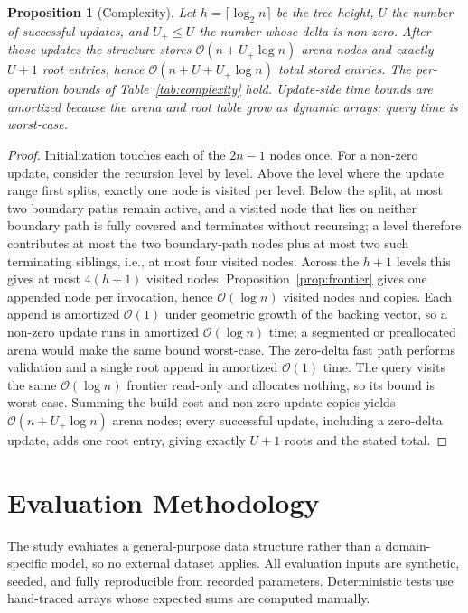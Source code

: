\documentclass[conference]{IEEEtran}
\newtheorem{proposition}{Proposition}
\begin{document}
\begin{proposition}[Complexity]
\label{prop:complexity}
Let $h = \lceil \log_2 n \rceil$ be the tree height, $U$ the number of successful updates, and
$U_{+}\leq U$ the number whose delta is non-zero. After those updates the structure stores
$\mathcal{O}(n+U_{+}\log n)$ arena nodes and exactly $U+1$ root entries, hence
$\mathcal{O}(n+U+U_{+}\log n)$ total stored entries. The per-operation bounds of
Table~\ref{tab:complexity} hold. Update-side time bounds are amortized because the arena and root
table grow as dynamic arrays; query time is worst-case.
\end{proposition}

\begin{proof}
Initialization touches each of the $2n-1$ nodes once. For a non-zero update, consider the
recursion level by level. Above the level where the update range first splits, exactly one node
is visited per level. Below the split, at most two boundary paths remain active, and a visited
node that lies on neither boundary path is fully covered and terminates without recursing; a
level therefore contributes at most the two boundary-path nodes plus at most two such
terminating siblings, i.e., at most four visited nodes. Across the $h+1$ levels this gives at most $4(h+1)$ visited
nodes. Proposition~\ref{prop:frontier} gives one appended node per invocation, hence
$\mathcal{O}(\log n)$ visited nodes and copies. Each
append is amortized $\mathcal{O}(1)$ under geometric growth of the backing vector, so a non-zero
update runs in amortized $\mathcal{O}(\log n)$ time; a segmented or preallocated arena would
make the same bound worst-case. The zero-delta fast path performs validation and a single root
append in amortized $\mathcal{O}(1)$ time. The query visits the same $\mathcal{O}(\log n)$
frontier read-only and allocates nothing, so its bound is worst-case. Summing the build cost and
non-zero-update copies yields $\mathcal{O}(n+U_{+}\log n)$ arena nodes; every successful update,
including a zero-delta update, adds one root entry, giving exactly $U+1$ roots and the stated total.
\end{proof}

\section{Evaluation Methodology}
\label{sec:dataset}

The study evaluates a general-purpose data structure rather than a domain-specific model, so no
external dataset applies. All evaluation inputs are synthetic, seeded, and fully reproducible
from recorded parameters. Deterministic tests use hand-traced arrays whose expected sums are
computed manually.
\end{document}
